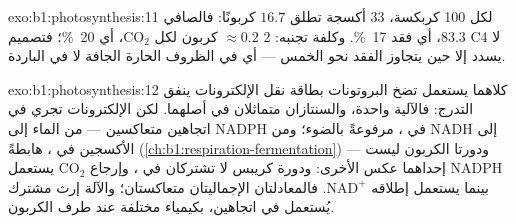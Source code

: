 \begin{solution}{exo:b1:photosynthesis:11}
لكل 100 كربكسة، 33 أكسجة تطلق $16.7$ كربونًا: فالصافي $83.3$، أي فقد
\qty{17}{\%}. وكلفة تجنبه: 2  $\approx
0.2$ كربون لكل
$\mathrm{CO_2}$، أي \qty{20}{\%}؛ فتصميم C4 لا يسدد إلا حين يتجاوز
الفقد نحو الخمس --- أي في الظروف الحارة الجافة لا في الباردة.
\end{solution}

\begin{solution}{exo:b1:photosynthesis:12}
كلاهما يستعمل  تضخ البروتونات بطاقة نقل الإلكترونات 
ينفق التدرج: فالآلية واحدة، والسنتازان متماثلان في أصلهما. لكن
الإلكترونات تجري في اتجاهين متعاكسين --- من الماء إلى NADPH في
، مرفوعةً بالضوء؛ ومن NADH إلى الأكسجين في ، هابطةً
(\cref{ch:b1:respiration-fermentation}) --- ودورتا الكربون ليست
إحداهما عكس الأخرى:  ودورة كريبس لا تشتركان في ،
وإرجاع $\mathrm{CO_2}$ يستعمل NADPH بينما يستعمل إطلاقه
$\mathrm{NAD^+}$. فالمعادلتان الإجماليتان متعاكستان؛ والآلة إرث مشترك
يُستعمل في اتجاهين، بكيمياء مختلفة عند طرف الكربون.
\end{solution}

